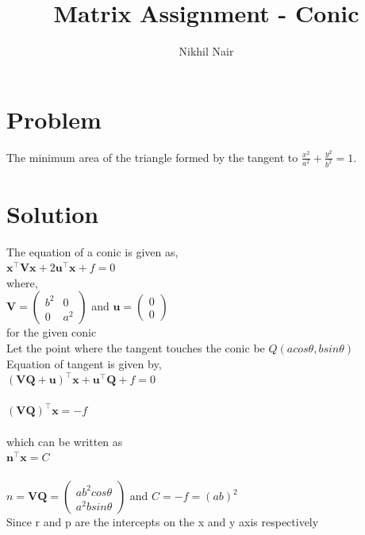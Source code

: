 \documentclass[journal,12pt,twocolumn]{IEEEtran}
\title{\mytitle}
\title{
Matrix Assignment - Conic
}
\author{Nikhil Nair}
\newcommand{\myvec}[1]{\ensuremath{\begin{pmatrix}#1\end{pmatrix}}}
\let\vec\mathbf
\begin{document}
\maketitle
\tableofcontents
\bigskip


\section{\textbf{Problem}}
The minimum area of the triangle formed by the tangent to $\frac{x^2}{a^2}+ \frac{y^2}{b^2}=1$.\\


\section{\textbf{Solution}}
The equation of a conic is given as,  
\\

${\vec{x^{\top}V x} + 2\vec{u^{\top}x}} + f=0$
\\

where,
\\

$\vec{V}=\myvec{b^2&0\\ 0&a^2}$ and $\vec{u}=\myvec{0\\0}$
\\

for the given conic
\\

Let the point where the tangent touches the conic be $Q(acos\theta,bsin\theta)$
\\

Equation of tangent is given by,
\\

$\vec{(VQ +u)^{\top}}\vec{x} + \vec{u^{\top}Q} + f = 0$
\\
\\


$\vec{(VQ)}^{\top}\vec{x} = -f$
\\
\\
which can be written as 
\\

$\vec{n}^{\top}\vec{x} = C$
\\
\\

$n=\vec{VQ} = \myvec{ab^2cos\theta\\a^2bsin\theta}$ and $C=-f=(ab)^2$
\\

Since r and p are the intercepts on the x and y axis respectively
\\
\end{document}
